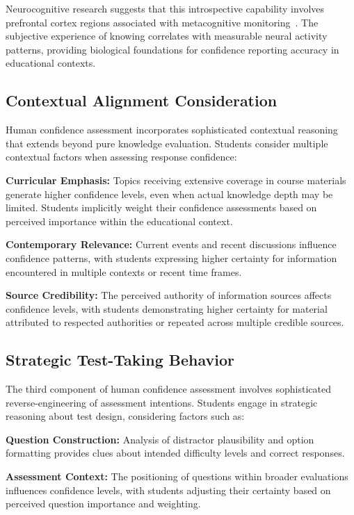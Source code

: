 \documentclass[sigconf]{acmart}
\begin{document}
Neurocognitive research suggests that this introspective capability involves prefrontal cortex regions associated with metacognitive monitoring~\cite{fleming2010knowing}. The subjective experience of knowing correlates with measurable neural activity patterns, providing biological foundations for confidence reporting accuracy in educational contexts.

\subsection{Contextual Alignment Consideration}

Human confidence assessment incorporates sophisticated contextual reasoning that extends beyond pure knowledge evaluation. Students consider multiple contextual factors when assessing response confidence:

\textbf{Curricular Emphasis:} Topics receiving extensive coverage in course materials generate higher confidence levels, even when actual knowledge depth may be limited. Students implicitly weight their confidence assessments based on perceived importance within the educational context.

\textbf{Contemporary Relevance:} Current events and recent discussions influence confidence patterns, with students expressing higher certainty for information encountered in multiple contexts or recent time frames.

\textbf{Source Credibility:} The perceived authority of information sources affects confidence levels, with students demonstrating higher certainty for material attributed to respected authorities or repeated across multiple credible sources.

\subsection{Strategic Test-Taking Behavior}

The third component of human confidence assessment involves sophisticated reverse-engineering of assessment intentions. Students engage in strategic reasoning about test design, considering factors such as:

\textbf{Question Construction:} Analysis of distractor plausibility and option formatting provides clues about intended difficulty levels and correct responses.

\textbf{Assessment Context:} The positioning of questions within broader evaluations influences confidence levels, with students adjusting their certainty based on perceived question importance and weighting.
\end{document}
